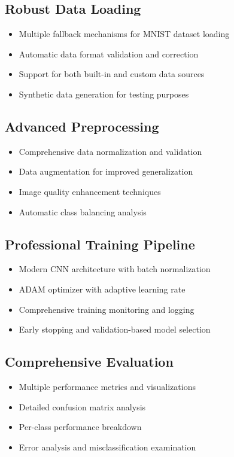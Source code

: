 \documentclass[12pt,a4paper]{article}
\begin{document}
\subsection{Robust Data Loading}
\begin{itemize}
    \item Multiple fallback mechanisms for MNIST dataset loading
    \item Automatic data format validation and correction
    \item Support for both built-in and custom data sources
    \item Synthetic data generation for testing purposes
\end{itemize}

\subsection{Advanced Preprocessing}
\begin{itemize}
    \item Comprehensive data normalization and validation
    \item Data augmentation for improved generalization
    \item Image quality enhancement techniques
    \item Automatic class balancing analysis
\end{itemize}

\subsection{Professional Training Pipeline}
\begin{itemize}
    \item Modern CNN architecture with batch normalization
    \item ADAM optimizer with adaptive learning rate
    \item Comprehensive training monitoring and logging
    \item Early stopping and validation-based model selection
\end{itemize}

\subsection{Comprehensive Evaluation}
\begin{itemize}
    \item Multiple performance metrics and visualizations
    \item Detailed confusion matrix analysis
    \item Per-class performance breakdown
    \item Error analysis and misclassification examination
\end{itemize}
\end{document}
